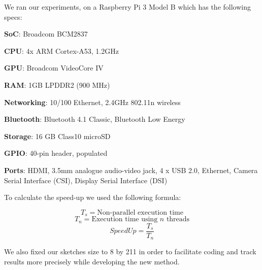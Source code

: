 \documentclass[twoside]{article}
\begin{document}
We ran our experiments, on a Raspberry Pi 3 Model B which has the following specs:

\begin{framed}

	\textbf{SoC}: Broadcom BCM2837\par
	\textbf{CPU}: 4x ARM Cortex-A53, 1.2GHz\par
	\textbf{GPU}: Broadcom VideoCore IV\par
	\vspace{1mm}
	\textbf{RAM}: 1GB LPDDR2 (900 MHz)\par
	\textbf{Networking}: 10/100 Ethernet, 2.4GHz 802.11n wireless\par
	\textbf{Bluetooth}: Bluetooth 4.1 Classic, Bluetooth Low Energy\par
	\textbf{Storage}: 16 GB Class10 microSD\par
	\textbf{GPIO}: 40-pin header, populated\par
	\textbf{Ports}: HDMI, 3.5mm analogue audio-video jack, 4 x USB 2.0, Ethernet, Camera Serial Interface (CSI), Display Serial Interface (DSI)
\end{framed}

To calculate the speed-up we used the following formula:

\par $$T_{s} =\text{Non-parallel execution time}$$
$$T_{n} = \text{Execution time using $n$ threads} $$
$$SpeedUp = \frac{T_{s}}{T_{n}}$$

We also fixed our sketches size to 8 by 211 in order to facilitate coding and track results more precisely while developing the new method.
\end{document}
